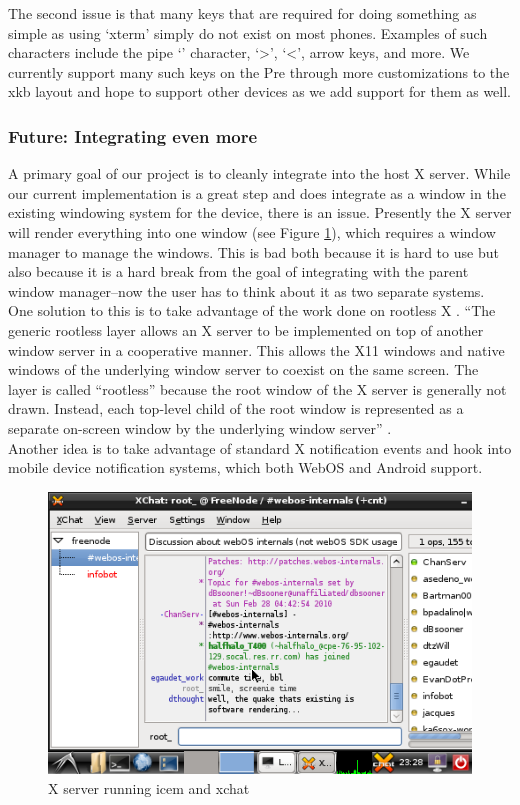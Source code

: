 The second issue is that many keys that are required for doing something as simple as using `xterm' simply do not exist on most phones.  Examples of such characters include the pipe `\textbar' character, `\textgreater', `\textless', arrow keys, and more.  We currently support many such keys on the Pre through more customizations to the xkb layout and hope to support other devices as we add support for them as well. \\

\subsubsection{Future: Integrating even more}
A primary goal of our project is to cleanly integrate into the host X server.  While our current implementation is a great step and does integrate as a window in the existing windowing system for the device, there is an issue.  Presently the X server will render everything into one window (see Figure \ref{fig:x_screenie}), which requires a window manager to manage the windows.  This is bad both because it is hard to use but also because it is a hard break from the goal of integrating with the parent window manager--now the user has to think about it as two separate systems.\\

One solution to this is to take advantage of the work done on rootless X \cite{rootless}.  ``The generic rootless layer allows an X server to be implemented on top of another window server in a cooperative manner. This allows the X11 windows and native windows of the underlying window server to coexist on the same screen. The layer is called ``rootless'' because the root window of the X server is generally not drawn. Instead, each top-level child of the root window is represented as a separate on-screen window by the underlying window server'' \cite{rootless}.\\

Another idea is to take advantage of standard X notification events \cite{notifications} and hook into mobile device notification systems, which both WebOS and Android support. \\

\begin{figure}[tbh]
\centering
\includegraphics[width=1.0\columnwidth]{xchat1}
\caption{X server running icem and xchat}
\label{fig:x_screenie}
\end{figure}
